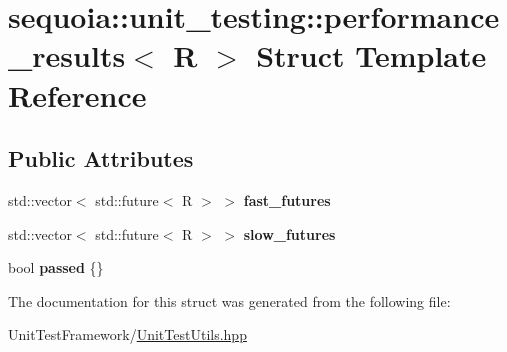 \hypertarget{structsequoia_1_1unit__testing_1_1performance__results}{}\section{sequoia\+::unit\+\_\+testing\+::performance\+\_\+results$<$ R $>$ Struct Template Reference}
\label{structsequoia_1_1unit__testing_1_1performance__results}
\subsection*{Public Attributes}
\begin{DoxyCompactItemize}
\item 
\mbox{\label{structsequoia_1_1unit__testing_1_1performance__results_a45cb3d79d8f1ce051a1a472a412542bc}} 
std\+::vector$<$ std\+::future$<$ R $>$ $>$ {\bfseries fast\+\_\+futures}
\item 
\mbox{\label{structsequoia_1_1unit__testing_1_1performance__results_a7b4ba23480f48b0324d71e3b65ff9367}} 
std\+::vector$<$ std\+::future$<$ R $>$ $>$ {\bfseries slow\+\_\+futures}
\item 
\mbox{\label{structsequoia_1_1unit__testing_1_1performance__results_a0a81903eb3368addbef7a8271758b73c}} 
bool {\bfseries passed} \{\}
\end{DoxyCompactItemize}


The documentation for this struct was generated from the following file\+:\begin{DoxyCompactItemize}
\item 
Unit\+Test\+Framework/\mbox{\hyperlink{_unit_test_utils_8hpp}{Unit\+Test\+Utils.\+hpp}}\end{DoxyCompactItemize}
